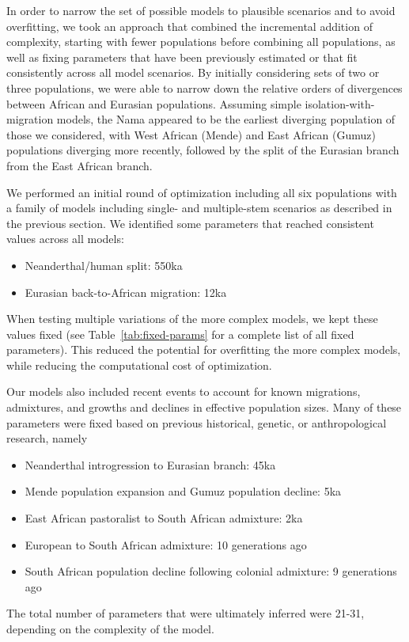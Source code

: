 \documentclass[]{article}
\begin{document}
In order to narrow the set of possible models to plausible scenarios and to
avoid overfitting, we took an approach that combined the incremental addition
of complexity, starting with fewer populations before combining all
populations, as well as fixing parameters that have been previously estimated
or that fit consistently across all model scenarios. By initially considering
sets of two or three populations, we were able to narrow down the relative
orders of divergences between African and Eurasian populations. Assuming simple
isolation-with-migration models, the Nama appeared to be the earliest diverging
population of those we considered, with West African (Mende) and East African
(Gumuz) populations diverging more recently, followed by the split of the
Eurasian branch from the East African branch.

We performed an initial round of optimization including all six populations
with a family of models including single- and multiple-stem scenarios as
described in the previous section. We identified some parameters that reached
consistent values across all models:
\begin{itemize}
    \item Neanderthal/human split: 550ka
    \item Eurasian back-to-African migration: 12ka
\end{itemize}
When testing multiple variations of the more complex models, we kept these
values fixed (see Table~\ref{tab:fixed-params} for a complete list of all fixed
parameters). This reduced the potential for overfitting the more complex
models, while reducing the computational cost of optimization.

Our models also included recent events to account for known migrations,
admixtures, and growths and declines in effective population sizes. Many of
these parameters were fixed based on previous historical, genetic, or
anthropological research, namely
\begin{itemize}
    \item Neanderthal introgression to Eurasian branch: 45ka
    \item Mende population expansion and Gumuz population decline: 5ka \citep{Gopalan2022-pw}
    \item East African pastoralist to South African admixture: 2ka \citep{Uren2016-nn}
    \item European to South African admixture: 10 generations ago
    \item South African population decline following colonial admixture: 9 generations ago
\end{itemize}
The total number of parameters that were
ultimately inferred were 21-31, depending on the complexity
of the model.
\end{document}
